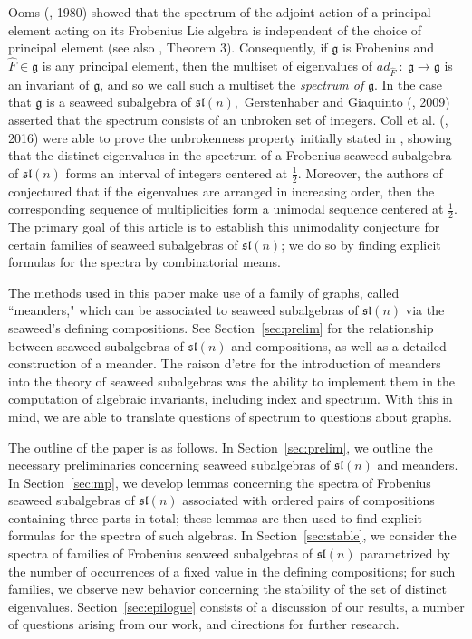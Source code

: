 \documentclass[letterpaper,10pt]{article}
\begin{document}
Ooms (\textbf{\cite{Ooms2}}, 1980) showed that the spectrum of the adjoint action of a principal element acting on its Frobenius Lie algebra is independent of the choice of principal element (see also \textbf{\cite{GG3}}, Theorem 3). Consequently, if $\mathfrak{g}$ is Frobenius and $\widehat{F}\in\mathfrak{g}$ is any principal element, then the multiset of eigenvalues of $ad_{\widehat{F}}~:~\mathfrak{g}\to\mathfrak{g}$ is an invariant of $\mathfrak{g}$, and so we call such a multiset the \textit{spectrum of} $\mathfrak{g}$. In the case that $\mathfrak{g}$ is a seaweed subalgebra of $\mathfrak{sl}(n),$ Gerstenhaber and Giaquinto (\textbf{\cite{GG3}}, 2009) asserted that the spectrum consists of an unbroken set of integers. Coll et al. (\textbf{\cite{unbroken}}, 2016) were able to prove  the unbrokenness property initially stated in \textbf{\cite{GG3}}, showing that the distinct eigenvalues in the spectrum of a Frobenius seaweed subalgebra of $\mathfrak{sl}(n)$ forms an interval of integers centered at $\frac{1}{2}$. Moreover, the authors of \textbf{\cite{unbroken}} conjectured that if the eigenvalues are arranged in increasing order, then the corresponding sequence of multiplicities form a unimodal sequence centered at $\frac{1}{2}$. The primary goal of this article is to establish this unimodality conjecture for certain families of seaweed subalgebras of $\mathfrak{sl}(n)$; we do so by finding explicit formulas for the spectra by combinatorial means.

The methods used in this paper make use of a family of graphs, called ``meanders," which can be associated to seaweed subalgebras of $\mathfrak{sl}(n)$ via the seaweed's defining compositions. See Section~\ref{sec:prelim} for the relationship between seaweed subalgebras of $\mathfrak{sl}(n)$ and compositions, as well as a detailed construction of a meander. The raison d'etre for the introduction of meanders into the theory of seaweed subalgebras was the ability to implement them in the computation of algebraic invariants, including index and spectrum. With this in mind, we are able to translate questions of spectrum to questions about graphs.


The outline of the paper is as follows. In Section~\ref{sec:prelim}, we outline the necessary preliminaries concerning seaweed subalgebras of $\mathfrak{sl}(n)$ and meanders. In Section~\ref{sec:mp}, we develop lemmas concerning the spectra of Frobenius seaweed subalgebras of $\mathfrak{sl}(n)$ associated with ordered pairs of compositions containing three parts in total; these lemmas are then used to find explicit formulas for the spectra of such algebras. In Section~\ref{sec:stable}, we consider the spectra of families of Frobenius seaweed subalgebras of $\mathfrak{sl}(n)$ parametrized by the number of occurrences of a fixed value in the defining compositions; for such families, we observe new behavior concerning the stability of the set of distinct eigenvalues.  Section~\ref{sec:epilogue} consists of a discussion of our results, a number of questions arising from our work, and directions for further research.
\end{document}

